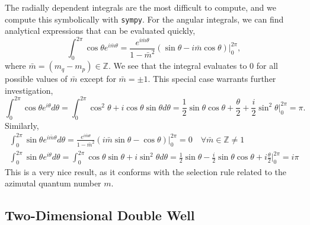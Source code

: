The radially dependent integrals are the most difficult to compute, and we compute this 
symbolically with \lstinline{sympy}. For the angular integrals, we can find analytical 
expressions that can be evaluated quickly,
\begin{equation}
    \int_0^{2\pi} \cos \theta e^{i\bar{m} \theta} 
    = \frac{e^{i\bar{m}\theta}}{1 - \bar{m}^2}
        (\sin \theta - i \bar{m}\cos \theta)\Big\lvert_0^{2\pi},
\end{equation}
where $\bar{m} = (m_q - m_p) \in \mathbb{Z}$. We see that the integral evaluates to $0$ 
for all possible values of $\bar{m}$ except for $\bar{m}=\pm1$. This special case warrants further 
investigation,
\begin{equation}
        \int_0^{2\pi} \cos \theta e^{i\theta} d\theta 
        = \int_0^{2\pi} \cos^2\theta + i\cos\theta\sin \theta d\theta 
        = \frac{1}{2}\sin\theta\cos\theta + \frac{\theta}{2} + \frac{i}{2}\sin^2\theta
            \Big\lvert_0^{2\pi} = \pi.
\end{equation}
Similarly,
\begin{equation}
   \begin{gathered}
   \int_0^{2\pi} \sin\theta e^{i\bar{m}\theta}d\theta 
    = \frac{e^{i\bar{m}\theta}}{1 - \bar{m}^2}
        (i\bar{m}\sin\theta - \cos\theta)\Big\lvert_0^{2\pi}
        = 0 \quad \forall \bar{m} \in \mathbb{Z} \neq 1 \\
    \int_0^{2\pi} \sin \theta e^{i \theta} d\theta 
    = \int_0^{2\pi} \cos\theta \sin\theta + i \sin^2\theta d\theta
    = \frac{1}{2} \sin\theta - \frac{i}{2}\sin\theta\cos\theta + i\frac{\theta}{2}
        \Big\lvert_0^{2\pi} = i\pi
   \end{gathered}
\end{equation}
This is a very nice result, as it conforms with the selection rule related to the 
azimutal quantum number $m$.

\subsection{Two-Dimensional Double Well}
\label{sec:2d_double_well}

